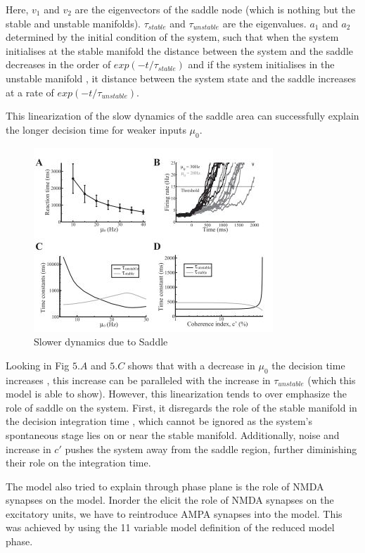 Here, $v_{1}$ and $v_{2}$ are the eigenvectors of the saddle node (which is nothing but the stable and unstable manifolds). $\tau_{stable}$ and $\tau_{unstable}$ are the eigenvalues. $a_{1}$ and $a_{2}$ determined by the initial condition of the system, such that when the system initialises at the stable manifold the distance between the system and the saddle decreases in the order of $exp(-t/\tau_{stable})$ and if the system initialises in the unstable manifold , it distance between the system state and the saddle increases at a rate of $exp(-t/\tau_{unstable})$.


This linearization of the slow dynamics of the saddle area can successfully explain the longer decision time for weaker inputs $\mu_{0}$.

\begin{figure}
  \includegraphics{fig/AnalysisSaddle.jpg}
  \caption{Slower dynamics due to Saddle}
  \label{fig:Phase Plane Analysis of Reduced Model}
\end{figure} 

 Looking in Fig $5. A$ and $5.C$ shows that with a decrease in $\mu_{0}$ the decision time increases , this increase can be paralleled with the increase in $\tau_{unstable}$ (which this model is able to show). However, this linearization tends to over emphasize the role of saddle on the system. First, it disregards the role of the stable manifold in the decision integration time , which cannot be ignored as the system's spontaneous stage lies on or near the stable manifold. Additionally, noise and increase in $c \prime$ pushes the system away from the saddle region, further diminishing their role on the integration time.

The model also tried to explain through phase plane is the role of NMDA synapses on the model. Inorder the elicit the role of NMDA synapses on the excitatory units, we have to reintroduce AMPA synapses into the model. This was achieved by using the 11 variable model definition of the reduced model phase. \\
 
